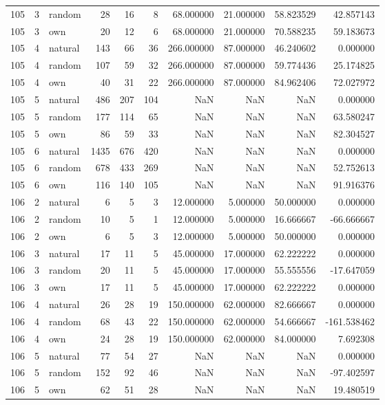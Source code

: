 \begin{table}[htbp]
\begin{tabular}{rrlrrrrrrr}
105 & 3 & random & 28 & 16 & 8 & 68.000000 & 21.000000 & 58.823529 & 42.857143 \\
105 & 3 & own & 20 & 12 & 6 & 68.000000 & 21.000000 & 70.588235 & 59.183673 \\
105 & 4 & natural & 143 & 66 & 36 & 266.000000 & 87.000000 & 46.240602 & 0.000000 \\
105 & 4 & random & 107 & 59 & 32 & 266.000000 & 87.000000 & 59.774436 & 25.174825 \\
105 & 4 & own & 40 & 31 & 22 & 266.000000 & 87.000000 & 84.962406 & 72.027972 \\
105 & 5 & natural & 486 & 207 & 104 & NaN & NaN & NaN & 0.000000 \\
105 & 5 & random & 177 & 114 & 65 & NaN & NaN & NaN & 63.580247 \\
105 & 5 & own & 86 & 59 & 33 & NaN & NaN & NaN & 82.304527 \\
105 & 6 & natural & 1435 & 676 & 420 & NaN & NaN & NaN & 0.000000 \\
105 & 6 & random & 678 & 433 & 269 & NaN & NaN & NaN & 52.752613 \\
105 & 6 & own & 116 & 140 & 105 & NaN & NaN & NaN & 91.916376 \\
106 & 2 & natural & 6 & 5 & 3 & 12.000000 & 5.000000 & 50.000000 & 0.000000 \\
106 & 2 & random & 10 & 5 & 1 & 12.000000 & 5.000000 & 16.666667 & -66.666667 \\
106 & 2 & own & 6 & 5 & 3 & 12.000000 & 5.000000 & 50.000000 & 0.000000 \\
106 & 3 & natural & 17 & 11 & 5 & 45.000000 & 17.000000 & 62.222222 & 0.000000 \\
106 & 3 & random & 20 & 11 & 5 & 45.000000 & 17.000000 & 55.555556 & -17.647059 \\
106 & 3 & own & 17 & 11 & 5 & 45.000000 & 17.000000 & 62.222222 & 0.000000 \\
106 & 4 & natural & 26 & 28 & 19 & 150.000000 & 62.000000 & 82.666667 & 0.000000 \\
106 & 4 & random & 68 & 43 & 22 & 150.000000 & 62.000000 & 54.666667 & -161.538462 \\
106 & 4 & own & 24 & 28 & 19 & 150.000000 & 62.000000 & 84.000000 & 7.692308 \\
106 & 5 & natural & 77 & 54 & 27 & NaN & NaN & NaN & 0.000000 \\
106 & 5 & random & 152 & 92 & 46 & NaN & NaN & NaN & -97.402597 \\
106 & 5 & own & 62 & 51 & 28 & NaN & NaN & NaN & 19.480519 \\

\end{tabular}
\end{table}
